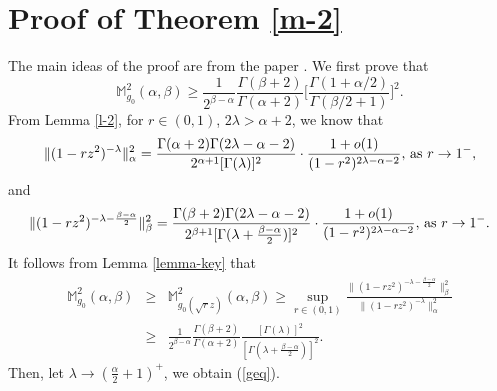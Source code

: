 \documentclass[10pt]{amsart}
\theoremstyle{definition}    %
\numberwithin{equation}{section}
\begin{document}
\section{\bf {Proof of Theorem \ref{m-2}}}
The main ideas of the proof are from the paper \cite{SS}.
We first prove that \begin{equation}\label{geq}\mathbb{M}_{g_0}^2(\alpha, \beta)\geq \frac{1}{2^{\beta-\alpha}}\frac{\Gamma(\beta+2)}{\Gamma(\alpha+2)}\Big[\frac{\Gamma(1+\alpha/2)}{\Gamma(\beta/2+1)}\Big]^2.\end{equation}
From Lemma \ref{l-2}, for $r\in (0,1)$, $2\lambda> \alpha+2$, we know that 
\begin{equation} 
 \|{(1-rz^2)^{-\lambda}}\|_{\alpha}^2=\frac{\Gamma(\alpha+2)\Gamma(2\lambda-\alpha-2)}{2^{\alpha+1}[\Gamma(\lambda)]^2}\cdot\frac{1+{o}(1)}{(1-r^2)^{2\lambda-\alpha-2}},\, {\textup{as}}\,\, r\rightarrow 1^{-}, \nonumber 
 \end{equation}
 and \begin{equation} 
 \|{(1-rz^2)^{-\lambda-\frac{\beta-\alpha}{2}}}\|_{\beta}^2=\frac{\Gamma(\beta+2)\Gamma(2\lambda-\alpha-2)}{2^{\beta+1}[\Gamma(\lambda+\frac{\beta-\alpha}{2})]^2}\cdot\frac{1+{o}(1)}{(1-r^2)^{2\lambda-\alpha-2}},\, {\textup{as}}\,\, r\rightarrow 1^{-}.\nonumber 
 \end{equation}
It follows from Lemma \ref{lemma-key} that  
\begin{eqnarray}
\mathbb{M}_{g_0}^2(\alpha, \beta)&\geq&\mathbb{M}_{g_0(\sqrt{r}z)}^2(\alpha, \beta)\geq \sup\limits_{r\in (0,1)}\frac{ \|{(1-rz^2)^{-\lambda-\frac{\beta-\alpha}{2}}}\|_{\beta}^2}{ \|{(1-rz^2)^{-\lambda}}\|_{\alpha}^2}\nonumber \\
&\geq& \frac{1}{2^{\beta-\alpha}}\frac{\Gamma(\beta+2)}{\Gamma(\alpha+2)}\frac{[\Gamma(\lambda)]^2}{[\Gamma(\lambda+\frac{\beta-\alpha}{2})]^2}. \nonumber\end{eqnarray} 
Then, let $\lambda\to (\frac{\alpha}{2}+1)^{+}$, we obtain (\ref{geq}).
\end{document}
